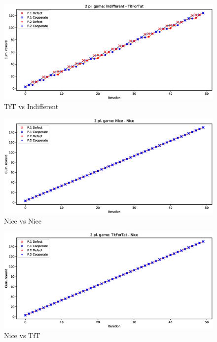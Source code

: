 \documentclass[journal,a4paper,10pt,twoside]{IEEEtran} %
\begin{document}
\begin{figure}[!ht]
    \centering
    \includegraphics[width=1\columnwidth]{../img/ipd2p/ipd2p-rewards-Indifferent-TitForTat}
    \caption{TfT vs Indifferent}
    \label{fig:tftvsindiff}
\end{figure}

\begin{figure}[!ht]
    \centering
    \includegraphics[width=1\columnwidth]{../img/ipd2p/ipd2p-rewards-Nice-Nice}
    \caption{Nice vs Nice}
    \label{fig:nicevsnice}
\end{figure}

\begin{figure}[!ht]
    \centering
    \includegraphics[width=1\columnwidth]{../img/ipd2p/ipd2p-rewards-TitForTat-Nice}
    \caption{Nice vs TfT}
    \label{fig:nicevstft}
\end{figure}
\end{document}
